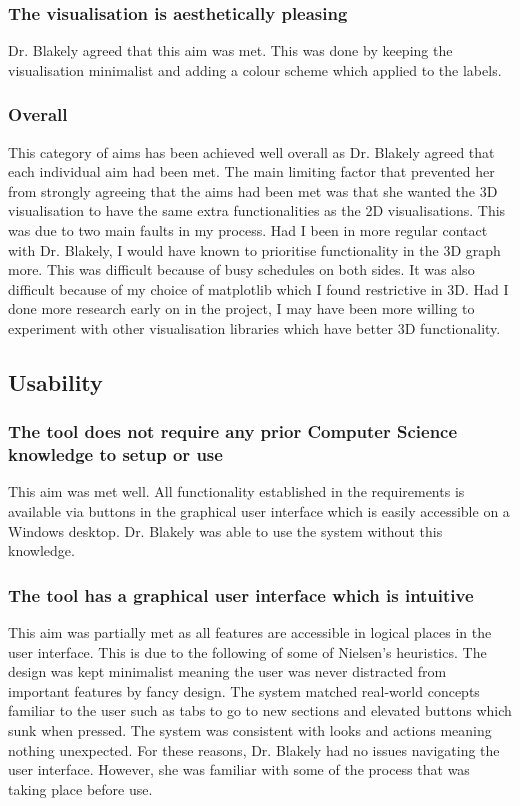 			\subsubsection{The visualisation is aesthetically pleasing}
				Dr. Blakely agreed that this aim was met. This was done by keeping the visualisation minimalist and adding a colour scheme which applied to the labels. 
			\subsubsection{Overall}
				This category of aims has been achieved well overall as Dr. Blakely agreed that each individual aim had been met. The main limiting factor that prevented her from strongly agreeing that the aims had been met was that she wanted the 3D visualisation to have the same extra functionalities as the 2D visualisations. This was due to two main faults in my process. Had I been in more regular contact with Dr. Blakely, I would have known to prioritise functionality in the 3D graph more. This was difficult because of busy schedules on both sides. It was also difficult because of my choice of matplotlib which I found restrictive in 3D. Had I done more research early on in the project, I may have been more willing to experiment with other visualisation libraries which have better 3D functionality.  
		\subsection{Usability}
			\subsubsection{The tool does not require any prior Computer Science knowledge to setup or use}
				This aim was met well. All functionality established in the requirements is available via buttons in the graphical user interface which is easily accessible on a Windows desktop. Dr. Blakely was able to use the system without this knowledge. 
			\subsubsection{The tool has a graphical user interface which is intuitive}
				This aim was partially met as all features are accessible in logical places in the user interface. This is due to the following of some of Nielsen's heuristics. The design was kept minimalist meaning the user was never distracted from important features by fancy design. The system matched real-world concepts familiar to the user such as tabs to go to new sections and elevated buttons which sunk when pressed. The system was consistent with looks and actions meaning nothing unexpected. For these reasons, Dr. Blakely had no issues navigating the user interface. However, she was familiar with some of the process that was taking place before use.  

